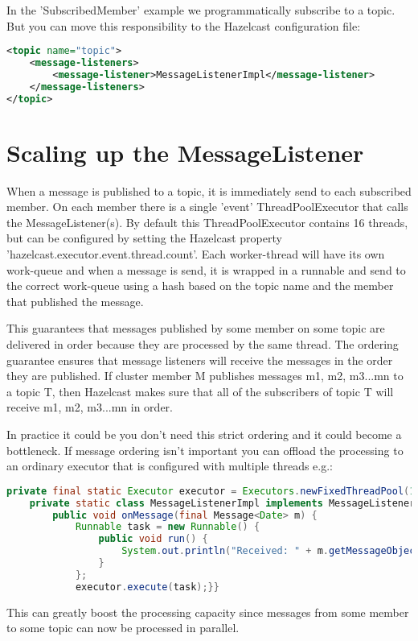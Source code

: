 In the 'SubscribedMember' example we programmatically subscribe to a topic. But you can move this responsibility to the  Hazelcast configuration file:
\begin{lstlisting}[language=xml]
<topic name="topic">
    <message-listeners>
        <message-listener>MessageListenerImpl</message-listener>
    </message-listeners>
</topic>
\end{lstlisting}

\section{Scaling up the MessageListener}
When a message is published to a topic, it is immediately send to each subscribed member. On each member there is a single 'event' ThreadPoolExecutor that calls the MessageListener(s). By default this ThreadPoolExecutor contains 16 threads, but can be configured by setting the Hazelcast property 'hazelcast.executor.event.thread.count'. Each worker-thread will have its own work-queue and when a message is send, it is wrapped in a runnable and send to the correct work-queue using a hash based on the topic name and the member that published the message.

This guarantees that messages published by some member on some topic are delivered in order because they are processed by the same thread. The ordering guarantee ensures that message listeners will receive the messages in the order they are published. If cluster member M publishes messages m1, m2, m3...mn to a topic T, then Hazelcast makes sure that all of the subscribers of topic T will receive m1, m2, m3...mn in order. 

In practice it could be you don't need this strict ordering and it could become a bottleneck. If message ordering isn't important you can offload the processing to an ordinary executor that is configured with multiple threads e.g.:
\begin{lstlisting}[language=java]
    private final static Executor executor = Executors.newFixedThreadPool(10);       
    private static class MessageListenerImpl implements MessageListener<Date> {
        public void onMessage(final Message<Date> m) {
            Runnable task = new Runnable() {
                public void run() {
                    System.out.println("Received: " + m.getMessageObject());
                }
            };
            executor.execute(task);}} 
\end{lstlisting}
This can greatly boost the processing capacity since messages from some member to some topic can now be processed in parallel.

